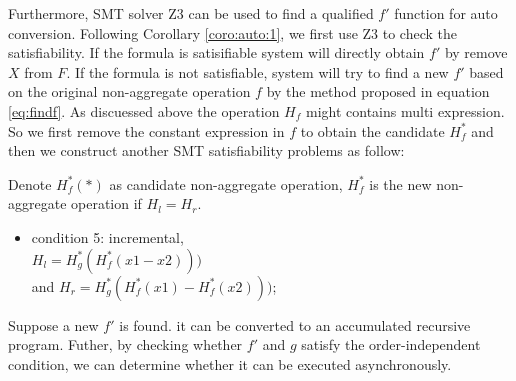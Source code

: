 Furthermore, SMT solver Z3 can be used to find a qualified $f'$ function for auto conversion. Following Corollary \ref{coro:auto:1}, we first use Z3 to check the satisfiability. 
If the formula is satisifiable system will directly obtain $f'$ by remove $X$ from $F$.
If the formula is not satisfiable, system will try to find a new $f'$ based on the original non-aggregate operation $f$ by the method proposed in equation \ref{eq:findf}. As discuessed above the operation $H_f$ might contains multi expression. So we first remove the constant expression in $f$ to obtain the candidate $H^*_f$ and then we construct another SMT satisfiability problems as follow:
 \begin{definition}
 	\label{coro:auto:2}
 	Denote $H^*_f(*)$ as candidate non-aggregate operation, $H^*_f$ is the new non-aggregate operation if $H_l=H_r$.
 	\begin{itemize}
 		\item condition 5: incremental, \\		
 	    	$H_l=H^*_g(H^*_f(x1-x2)))$\\		
 		and  $H_r =H^*_g(H^*_f(x1)-H^*_f(x2)))$;
 	\end{itemize}
 \end{definition}
Suppose a new $f'$ is found. it can be converted to an accumulated recursive program. Futher, by checking whether $f'$ and $g$ satisfy the order-independent condition, we can determine whether it can be executed asynchronously.
